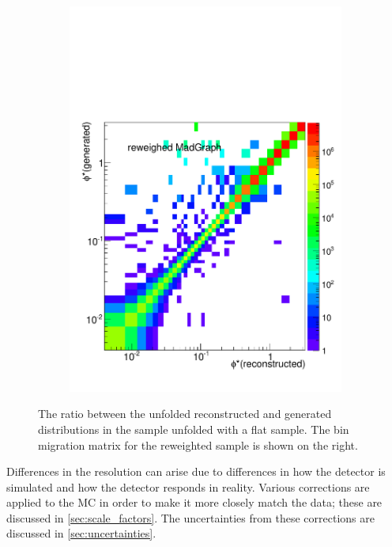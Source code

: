 \begin{figure}[!htbp]
\begin{subfigure}[b]{\SideBySidePlotWidth}
        \includegraphics[width=\textwidth]{figures/BinM_M_flat.pdf}
        \caption{}
        \label{fig:unfolding_flat_bin_migration}
    \end{subfigure}
    \caption[
        The ratio between the unfolded reconstructed and generated \phistar
        distributions in the \POWHEG sample unfolded with a flat \MADGRAPH
        sample.
    ]{
        The ratio between the unfolded reconstructed and generated \phistar
        distributions in the \POWHEG sample unfolded with a flat \MADGRAPH
        sample. The bin migration matrix for the reweighted \MADGRAPH sample is
        shown on the right.
    }
    \label{fig:flat_unfolding}
\end{figure}

Differences in the resolution can arise due to differences in how the
detector is simulated and how the detector responds in reality. Various
corrections are applied to the MC in order to make it more closely match the
data; these are discussed in \cref{sec:scale_factors}. The uncertainties
from these corrections are discussed in \cref{sec:uncertainties}.

